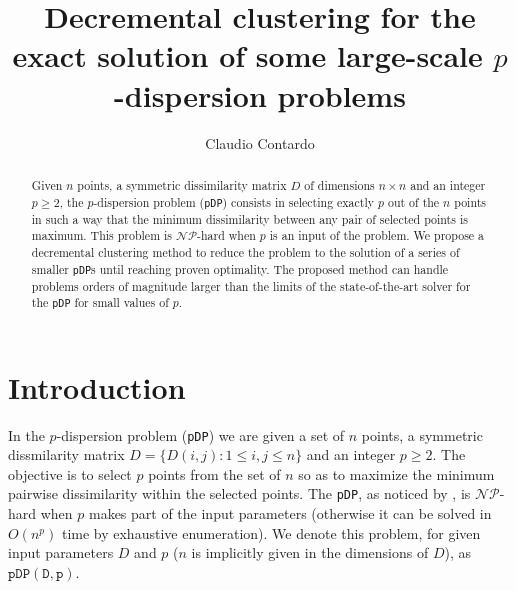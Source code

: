 \documentclass[a4paper,10pt]{article}
\newcommand{\nphard}{$\mathcal{NP}$-hard}
\newcommand{\pDP}{\texttt{pDP}}
\newcommand{\pdp}[2]{$\mathtt{pDP({#1}, {#2})}$}
\begin{document}
\title{Decremental clustering for the exact solution of some large-scale $p$-dispersion problems}

\author[ ]{Claudio Contardo}



\maketitle

\begin{abstract}
Given $n$ points, a symmetric dissimilarity matrix $D$ of dimensions $n\times n$ and an integer $p\geq 2$, the $p$-dispersion problem (\pDP{}) consists in selecting exactly $p$ out of the $n$ points in such a way that the minimum dissimilarity between any pair of selected points is maximum. This problem is \nphard{} when $p$ is an input of the problem. We propose a decremental clustering method to reduce the problem to the solution of a series of smaller \pDP{}s until reaching proven optimality. The proposed method can handle problems orders of magnitude larger than the limits of the state-of-the-art solver for the \pDP{} for small values of $p$.
\end{abstract}

\section{Introduction\label{section:intro}}

In the $p$-dispersion problem (\pDP{}) we are given a set of $n$ points, a symmetric dissmilarity matrix $D = \{D(i, j): 1\leq i, j\leq n\}$ and an integer $p\geq 2$. The objective is to select $p$ points from the set of $n$ so as to maximize the minimum pairwise dissimilarity within the selected points. The \pDP{}, as noticed by \citet{Erkut1990discrete}, is \nphard{} when $p$ makes part of the input parameters (otherwise it can be solved in $O(n^p)$ time by exhaustive enumeration). We denote this problem, for given input parameters $D$ and $p$ ($n$ is implicitly given in the dimensions of $D$), as \pdp{D}{p}.%
	
\end{document}
